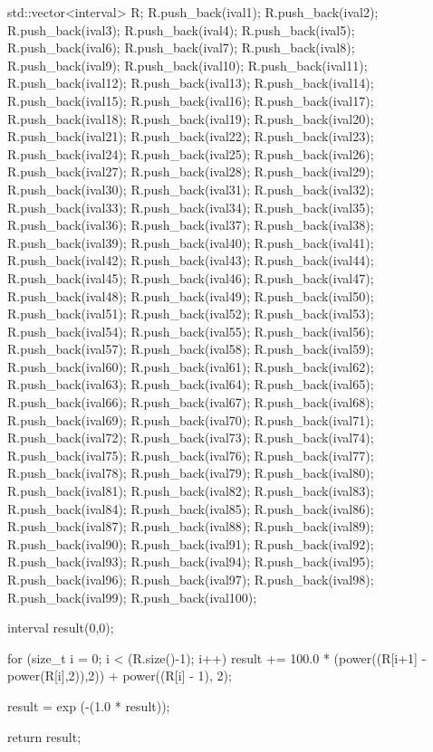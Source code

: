 \begin{DoxyCode}
{
   std::vector<interval> R;
   R.push_back(ival1);
R.push_back(ival2);
R.push_back(ival3);
R.push_back(ival4);
R.push_back(ival5);
R.push_back(ival6);
R.push_back(ival7);
R.push_back(ival8);
R.push_back(ival9);
R.push_back(ival10);
R.push_back(ival11);
R.push_back(ival12);
R.push_back(ival13);
R.push_back(ival14);
R.push_back(ival15);
R.push_back(ival16);
R.push_back(ival17);
R.push_back(ival18);
R.push_back(ival19);
R.push_back(ival20);
R.push_back(ival21);
R.push_back(ival22);
R.push_back(ival23);
R.push_back(ival24);
R.push_back(ival25);
R.push_back(ival26);
R.push_back(ival27);
R.push_back(ival28);
R.push_back(ival29);
R.push_back(ival30);
R.push_back(ival31);
R.push_back(ival32);
R.push_back(ival33);
R.push_back(ival34);
R.push_back(ival35);
R.push_back(ival36);
R.push_back(ival37);
R.push_back(ival38);
R.push_back(ival39);
R.push_back(ival40);
R.push_back(ival41);
R.push_back(ival42);
R.push_back(ival43);
R.push_back(ival44);
R.push_back(ival45);
R.push_back(ival46);
R.push_back(ival47);
R.push_back(ival48);
R.push_back(ival49);
R.push_back(ival50);
R.push_back(ival51);
R.push_back(ival52);
R.push_back(ival53);
R.push_back(ival54);
R.push_back(ival55);
R.push_back(ival56);
R.push_back(ival57);
R.push_back(ival58);
R.push_back(ival59);
R.push_back(ival60);
R.push_back(ival61);
R.push_back(ival62);
R.push_back(ival63);
R.push_back(ival64);
R.push_back(ival65);
R.push_back(ival66);
R.push_back(ival67);
R.push_back(ival68);
R.push_back(ival69);
R.push_back(ival70);
R.push_back(ival71);
R.push_back(ival72);
R.push_back(ival73);
R.push_back(ival74);
R.push_back(ival75);
R.push_back(ival76);
R.push_back(ival77);
R.push_back(ival78);
R.push_back(ival79);
R.push_back(ival80);
R.push_back(ival81);
R.push_back(ival82);
R.push_back(ival83);
R.push_back(ival84);
R.push_back(ival85);
R.push_back(ival86);
R.push_back(ival87);
R.push_back(ival88);
R.push_back(ival89);
R.push_back(ival90);
R.push_back(ival91);
R.push_back(ival92);
R.push_back(ival93);
R.push_back(ival94);
R.push_back(ival95);
R.push_back(ival96);
R.push_back(ival97);
R.push_back(ival98);
R.push_back(ival99);
R.push_back(ival100);

    interval result(0,0);
    
    for (size_t i = 0; i < (R.size()-1); i++) 
    {
      result += 100.0 * (power((R[i+1] - power(R[i],2)),2)) +
                  power((R[i] - 1), 2);
    }
  
  result = exp (-(1.0 * result));
  
  return result;
  
}
\end{DoxyCode}
